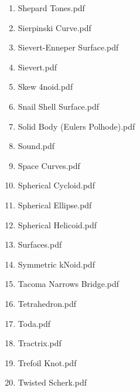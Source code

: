 \documentclass[11pt]{article}
\begin{document}
\begin{enumerate}
\begin{enumerate}
\item Shepard Tones.pdf
\label{sec-1-1-1-1-29-20-113}

\item Sierpinski Curve.pdf
\label{sec-1-1-1-1-29-20-114}

\item Sievert-Enneper Surface.pdf
\label{sec-1-1-1-1-29-20-115}

\item Sievert.pdf
\label{sec-1-1-1-1-29-20-116}

\item Skew 4noid.pdf
\label{sec-1-1-1-1-29-20-117}

\item Snail Shell Surface.pdf
\label{sec-1-1-1-1-29-20-118}

\item Solid Body (Eulers Polhode).pdf
\label{sec-1-1-1-1-29-20-119}

\item Sound.pdf
\label{sec-1-1-1-1-29-20-120}

\item Space Curves.pdf
\label{sec-1-1-1-1-29-20-121}

\item Spherical Cycloid.pdf
\label{sec-1-1-1-1-29-20-122}

\item Spherical Ellipse.pdf
\label{sec-1-1-1-1-29-20-123}

\item Spherical Helicoid.pdf
\label{sec-1-1-1-1-29-20-124}

\item Surfaces.pdf
\label{sec-1-1-1-1-29-20-125}

\item Symmetric kNoid.pdf
\label{sec-1-1-1-1-29-20-126}

\item Tacoma Narrows Bridge.pdf
\label{sec-1-1-1-1-29-20-127}

\item Tetrahedron.pdf
\label{sec-1-1-1-1-29-20-128}

\item Toda.pdf
\label{sec-1-1-1-1-29-20-129}

\item Tractrix.pdf
\label{sec-1-1-1-1-29-20-130}

\item Trefoil Knot.pdf
\label{sec-1-1-1-1-29-20-131}

\item Twisted Scherk.pdf
\label{sec-1-1-1-1-29-20-132}


\end{enumerate}
\end{enumerate}
\end{document}
